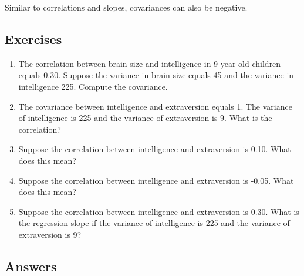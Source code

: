 \documentclass[]{book}\usepackage[]{graphicx}\usepackage[]{color}
\begin{document}
Similar to correlations and slopes, covariances can also be negative.


\subsection{Exercises}

\begin{enumerate}

\item The correlation between brain size and intelligence in 9-year old children equals 0.30. Suppose the variance in brain size equals 45 and the variance in intelligence 225. Compute the covariance.



\item The covariance between intelligence and extraversion equals 1. The variance of intelligence is 225 and the variance of extraversion is 9. What is the correlation?




\item Suppose the correlation between intelligence and extraversion is 0.10. What does this mean?



\item Suppose the correlation between intelligence and extraversion is -0.05. What does this mean?




\item Suppose the correlation between intelligence and extraversion is 0.30. What is the regression slope if the variance of intelligence is 225 and the variance of extraversion is 9?



\end{enumerate}

\subsection{Answers}
\end{document}

